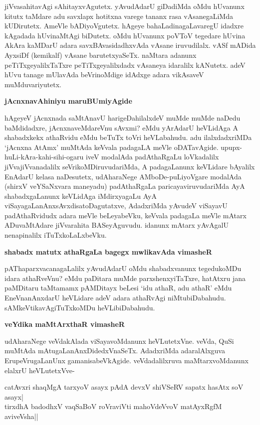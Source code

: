 \noindent
jiVvasahitavAgi sAhitayxvAgutetx. yAvudAdarU giDadiMda oMdu hUvanunx kitutx taMdare adu savxlapx hotitxna varege tananx rasa vAsanegaLiMda kUDirutetx. AmeVle bADiyoVgutetx. hAgeye bahaLa\-dina\-gaLa\-varegU idadxre kAgadada hUvinaMtAgi biDutetx. oMdu hUvanunx poVToV tegedare hUvina AkAra kaMDarU adara savxBAvasidadhxvAda vAsane iruvudilalx. vASf mADida AyxsiDf (kemikalf) vAsane barutetx\-yaSeTx. naMtara adanunx peTiTxgeyalilxTaTxre peTiTxgeyalilxdadx vAsaneya idaralilx kANutetx. adeV hUvu tanage mUlavAda beVrinoMdige idAdxge adara vikAsaveV muMduvariyutetx.

\newpage

{\bigskip
\noindent
{\large\bf jAcnxnavAhiniyu maruBUmiyAgide}}\label{page110}
\medskip

\noindent
hAgeyeV jAcnxnada saMtAnavU harigeDahilalxdeV muMde muMde naDedu 
baMdidadxre, jAcnxnaveMdareVnu sAvxmi? eMdu yArAdarU heVLidAga A 
shabadxkekx athaRvidu eMdu beTuTx toVri heVLabahudu. adu ilalxdadxriMDa 
`jAcnxna AtAmx' muMtAda keVvala padagaLA meVle oDATavAgide. 
upupx-huLi-kAra-kahi-\-sihi-ogaru iveV modalAda padAthaRgaLu loVkadalilx 
jiVvajiVvanadalilx seVrikoMDiruvudariMda, A padagaLanunx keVLidare bAyalilx EnAdarU kelasa naDesutetx, udAharaNege AMboDe-puLiyoVgare moda\-lAda (shirxV veYSaNxvara maneyadu) padAthaRgaLa paricayaviruvudariMda AyA shabadxgaLanunx keVLidAga iMdirxyagaLu AyA viSayagaLanAnxsAvxdisatoDagutatxve, AdadxriMda yAvudeV viSayavU padAthaR\-vidudx adara meVle beLeyabeVku, keVvala padagaLa meVle mAtarx ADuvaMtAdare jiVvarahita BASeyAgu\-vudu. idanunx mAtarx yAvAgalU nenapinalilx iTuTxkoLaLxbeVku.

{\bigskip
\noindent
{\large\bf shabadx matutx athaRgaLa bagegx mwlikavAda vimasheR}}\label{page111}
\medskip

\noindent
pAThaparxvacanagaLalilx yAvudAdarU oMdu shabadxvanunx tegedukoMDu idara 
athaRveVnu? eMdu paDi\-tara muMde parxshenxyiTaTxre, hatAtxru jana paMDitaru taMtamamx pAMDitayx beLesi `idu athaR, adu athaR' eMdu EneVnanAnxdarU heVLidare adeV adara athaRvAgi niMtubiDabahudu. sAMkeVtikavAgiTuTx\-koMDu heVLibiDabahudu.

{\bigskip
\noindent
{\large\bf veYdika maMtArxthaR vimasheR}}\label{page111}
\medskip

\noindent
udAharaNege veVdakAlada viSayavoMdanunx heVLutetxVne. veVda, QuSi 
muMtAda mAtugaLanAnxDi\-dedxV\-naSeTx. AdadxriMda adaralAlxguva 
ErupeVrugaLanUnx gamanisabeVkAgide. veVdadalilxruva maMtarxvoMdanunx elalxrU heVLutetxVve-

\begin{shloka}
catAvxri shaqMgA tarxyoV asayx pAdA devxV shiVSeRV sapatx hasAtx soV asayx|\\\label{111}
tirxdhA badodhxV vaqSaBoV roVraviVti mahoVdeVvoV matAyxRgfM aviveVsha||
\end{shloka}

